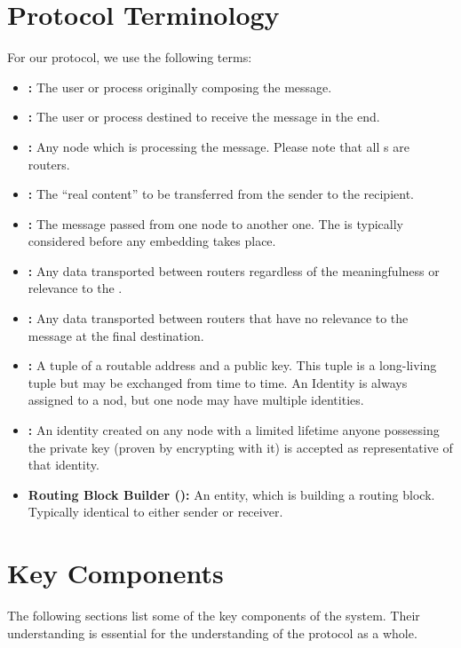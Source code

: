 \section{Protocol Terminology}
For our protocol, we use the following terms:
\begin{itemize}
	\item \textbf{:} The user or process originally composing the message.
	\item \textbf{:} The user or process destined to receive the message in the end.
	\item \textbf{:} Any node which is processing the message. Please note that all \VortexNode{}s are routers.
	\item \textbf{:} The ``real content'' to be transferred from the sender to the recipient.    
	\item \textbf{:} The message passed from one node to another one. The \VortexMessage is typically considered before any embedding takes place.
	\item \textbf{:} Any data transported between routers regardless of the meaningfulness or relevance to the \VortexMessage.
	\item \textbf{:} Any data transported between routers that have no relevance to the message at the final destination.
	\item \textbf{:} A tuple of a routable address and a public key. This tuple is a long-living tuple but may be exchanged from time to time. An Identity is always assigned to a nod, but one node may have multiple identities. 
	\item \textbf{:} An identity created on any node with a limited lifetime anyone possessing the private key (proven by encrypting with it) is accepted as representative of that identity.
	\item \textbf{Routing Block Builder ():} An entity, which is building a routing block. Typically identical to either sender or receiver.
\end{itemize}

\section{Key Components}
The following sections list some of the key components of the system. Their understanding is essential for the understanding of the protocol as a whole.

